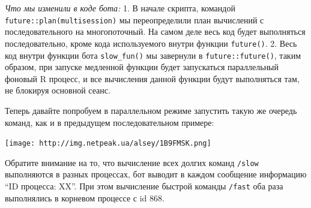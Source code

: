 \documentclass[
]{book}
\newenvironment{Shaded}{\begin{snugshade}}{\end{snugshade}}
\newcommand{\AttributeTok}[1]{\textcolor[rgb]{0.13,0.29,0.53}{#1}}
\newcommand{\CommentTok}[1]{\textcolor[rgb]{0.56,0.35,0.01}{\textit{#1}}}
\newcommand{\FunctionTok}[1]{\textcolor[rgb]{0.13,0.29,0.53}{\textbf{#1}}}
\newcommand{\NormalTok}[1]{#1}
\newcommand{\OtherTok}[1]{\textcolor[rgb]{0.56,0.35,0.01}{#1}}
\newcommand{\SpecialCharTok}[1]{\textcolor[rgb]{0.81,0.36,0.00}{\textbf{#1}}}
\newcommand{\StringTok}[1]{\textcolor[rgb]{0.31,0.60,0.02}{#1}}
\begin{document}
\begin{Shaded}
\end{Shaded}

\emph{Что мы изменили в коде бота:}
1. В начале скрипта, командой \texttt{future::plan(\textquotesingle{}multisession\textquotesingle{})} мы переопределили план вычислений с последовательного на многопоточный. На самом деле весь код будет выполняться последовательно, кроме кода используемого внутри функции \texttt{future()}.
2. Весь код внутри функции бота \texttt{slow\_fun()} мы завернули в \texttt{future::future()}, таким образом, при запуске медленной функции будет запускаться параллельный фоновый R процесс, и все вычисления данной функции будут выполняться там, не блокируя основной сеанс.

Теперь давайте попробуем в параллельном режиме запустить такую же очередь команд, как и в предыдущем последовательном примере:

\texttt{[image: http://img.netpeak.ua/alsey/1B9FMSK.png]}

Обратите внимание на то, что вычисление всех долгих команд \texttt{/slow} выполняются в разных процессах, бот выводит в каждом сообщение информацию ``ID процесса: XX''. При этом вычисление быстрой команды \texttt{/fast} оба раза выполнялись в корневом процессе с id 868.
\end{document}
